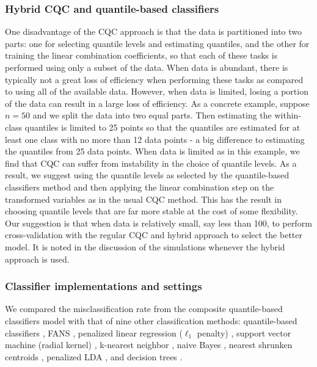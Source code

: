 \subsubsection{Hybrid CQC and quantile-based classifiers}
\label{sec:hybid-cqc}

One disadvantage of the CQC approach is that the data is partitioned into two
parts: one for selecting quantile levels and estimating quantiles, and the other
for training the linear combination coefficients, so that each of these tasks is
performed using only a subset of the data.  When data is abundant, there is
typically not a great loss of efficiency when performing these tasks as compared
to using all of the available data.  However, when data is limited, losing a
portion of the data can result in a large loss of efficiency.  As a concrete
example, suppose $n = 50$ and we split the data into two equal parts.  Then
estimating the within-class quantiles is limited to 25 points so that the
quantiles are estimated for at least one class with no more than 12 data points
- a big difference to estimating the quantiles from 25 data points.  When data
is limited as in this example, we find that CQC can suffer from instability in
the choice of quantile levels.  As a result, we suggest using the quantile
levels as selected by the quantile-based classifiers method and then applying
the linear combination step on the transformed variables as in the usual CQC
method.  This has the result in choosing quantile levels that are far more
stable at the cost of some flexibility.  Our suggestion is that when data is
relatively small, say less than 100, to perform cross-validation with the
regular CQC and hybrid approach to select the better model.  It is noted in the
discussion of the simulations whenever the hybrid approach is used.


\subsubsection{Classifier implementations and settings}
\label{sec:classifier-implementations}

We compared the misclassification rate from the composite quantile-based
classifiers model with that of nine other classification methods: quantile-based
classifiers \cite{hennig2016}, FANS \cite{fan2016}, penalized linear regression
($\ell_1$ penalty) \cite{park2007}, support vector machine (radial kernel)
\cite{cortes1995}, k-nearest neighbor \cite{cover1967}, naive Bayes
\cite{hastie2009}, nearest shrunken centroids \cite{tibshirani2002}, penalized
LDA \cite{witten2011}, and decision trees \cite{breiman1984}.  

